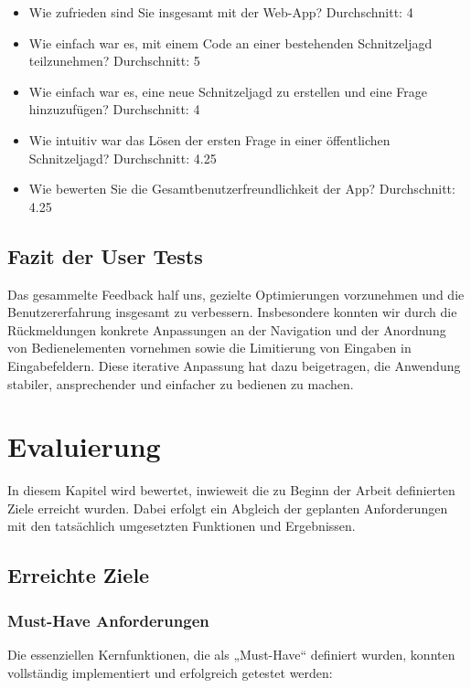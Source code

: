 \documentclass[oneside]{ausarbeitung}
\begin{document}
\begin{itemize}
    \item Wie zufrieden sind Sie insgesamt mit der Web-App? Durchschnitt: 4
    \item Wie einfach war es, mit einem Code an einer bestehenden Schnitzeljagd teilzunehmen? Durchschnitt: 5
    \item Wie einfach war es, eine neue Schnitzeljagd zu erstellen und eine Frage hinzuzufügen? Durchschnitt: 4
    \item Wie intuitiv war das Lösen der ersten Frage in einer öffentlichen Schnitzeljagd? Durchschnitt: 4.25
    \item Wie bewerten Sie die Gesamtbenutzerfreundlichkeit der App? Durchschnitt: 4.25
\end{itemize}

\section{Fazit der User Tests}

Das gesammelte Feedback half uns, gezielte Optimierungen vorzunehmen und die Benutzererfahrung insgesamt zu verbessern.  
Insbesondere konnten wir durch die Rückmeldungen konkrete Anpassungen an der Navigation und der Anordnung von Bedienelementen vornehmen sowie die Limitierung von Eingaben in Eingabefeldern.  
Diese iterative Anpassung hat dazu beigetragen, die Anwendung stabiler, ansprechender und einfacher zu bedienen zu machen.

\chapter{Evaluierung}
\label{cha:evaluierung}

In diesem Kapitel wird bewertet, inwieweit die zu Beginn der Arbeit definierten Ziele erreicht wurden.  
Dabei erfolgt ein Abgleich der geplanten Anforderungen mit den tatsächlich umgesetzten Funktionen und Ergebnissen.  

\section{Erreichte Ziele}

\subsection{Must-Have Anforderungen}

Die essenziellen Kernfunktionen, die als „Must-Have“ definiert wurden, konnten vollständig implementiert und erfolgreich getestet werden:  
\end{document}
